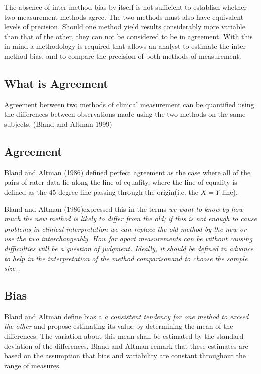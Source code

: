 \documentclass[Main.tex]{subfiles}
\begin{document}
	The absence of inter-method bias by itself is not sufficient to
	establish whether two measurement methods agree. The two
	methods must also have equivalent levels of precision. Should one
	method yield results considerably more variable than that of the
	other, they can not be considered to be in agreement. With this in
	mind a methodology is required that allows an analyst to estimate
	the inter-method bias, and to compare the precision of both
	methods of measurement.

	
	
\subsection{What is Agreement}

Agreement between two methods of clinical measurement can be quantified using the differences between observations made using the two methods on the same subjects. (Bland and Altman 1999)

\subsection{Agreement} Bland and Altman (1986) defined perfect
agreement as the case where all of the pairs of rater data lie
along the line of equality, where the line of equality is defined
as the $45$ degree line passing through the origin(i.e. the $X=Y$
line).

Bland and Altman (1986)expressed this in the terms \emph{we want
	to know by how much the new method is likely to differ from the
	old; if this is not enough to cause problems in clinical
	interpretation we can replace the old method by the new or use the
	two interchangeably. How far apart measurements can be without
	causing difficulties will be a question of judgment. Ideally, it
	should be defined in advance to help in the interpretation of the
	method comparisonand to choose the sample size .}
\subsection{Bias}
Bland and Altman define bias a \emph{a consistent tendency for one
	method to exceed the other} and propose estimating its value
by determining the mean of the differences. The variation about
this mean shall be estimated by the  standard deviation of the
differences. Bland and Altman remark that these estimates are based on the
assumption that bias and variability are constant throughout the
range of measures.
\end{document}

